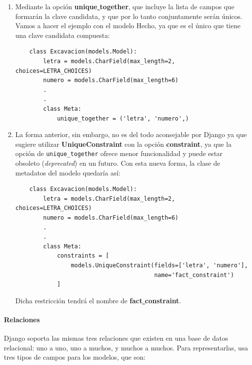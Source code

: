     \begin{enumerate}
        \item Mediante la opción \textbf{unique\underline{ }together}, que incluye la lista
        de campos que formarán la clave candidata, y que por lo tanto conjuntamente serán
        únicos. Vamos a hacer el ejemplo con el modelo Hecho, ya que es el único que tiene
        una clave candidata compuesta:
        
    
    \begin{verbatim}
    class Excavacion(models.Model):
        letra = models.CharField(max_length=2, choices=LETRA_CHOICES)
        numero = models.CharField(max_length=6)    
        .
        .
        class Meta:
            unique_together = ('letra', 'numero',)
    \end{verbatim}

        \item La forma anterior, sin embargo, no es del todo aconsejable por Django ya
        que sugiere utilizar \textbf{UniqueConstraint} con la opción \textbf{constraint},
        ya que la opción de \verb|unique_together| ofrece menor funcionalidad y puede
        estar obsoleto (\textit{deprecated}) en un futuro. Con esta nueva forma, la clase
        de metadatos del modelo quedaría así:
        
    
    \begin{verbatim}
    class Excavacion(models.Model):
        letra = models.CharField(max_length=2, choices=LETRA_CHOICES)
        numero = models.CharField(max_length=6)    
        .
        .
        class Meta:
            constraints = [
                models.UniqueConstraint(fields=['letra', 'numero'], 
                                        name='fact_constraint')                                                  
            ]
    \end{verbatim}

    Dicha restricción tendrá el nombre de \textbf{fact\underline{ }constraint}.
    \end{enumerate}

    \paragraph{Relaciones} \underline{}
    \newline Django soporta las mismas tres relaciones que existen en una base de datos relacional:
    uno a uno, uno a muchos, y muchos a muchos. Para representarlas, usa tres tipos de campos
    para los modelos, que son:

